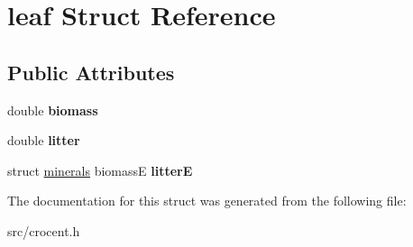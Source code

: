 \hypertarget{structleaf}{\section{leaf Struct Reference}
\label{structleaf}
}
\subsection*{Public Attributes}
\begin{DoxyCompactItemize}
\item 
\hypertarget{structleaf_a5f748bfcc8e5be3ddbc12f09ccc0f7af}{double {\bfseries biomass}}\label{structleaf_a5f748bfcc8e5be3ddbc12f09ccc0f7af}

\item 
\hypertarget{structleaf_a089c4ff210ff815effc3da17ec4b0a56}{double {\bfseries litter}}\label{structleaf_a089c4ff210ff815effc3da17ec4b0a56}

\item 
\hypertarget{structleaf_a7d47a3a8ef32f6961a6189f8c3c14806}{struct \hyperlink{structminerals}{minerals} biomass\-E {\bfseries litter\-E}}\label{structleaf_a7d47a3a8ef32f6961a6189f8c3c14806}

\end{DoxyCompactItemize}


The documentation for this struct was generated from the following file\-:\begin{DoxyCompactItemize}
\item 
src/crocent.\-h\end{DoxyCompactItemize}
